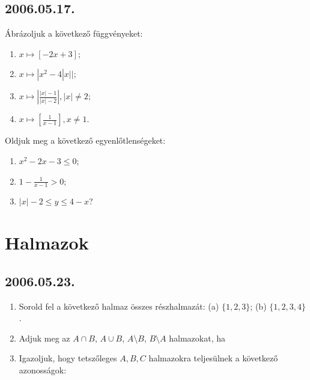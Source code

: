 \subsection*{2006.05.17.}
Ábrázoljuk a következő függvényeket:
\begin{enumerate}
\item $x \mapsto [-2x+3]$;
\item $x \mapsto |x^2-4|x||$;
\item $x \mapsto \left|\frac{|x|-1}{|x|-2}\right|, |x|\neq2$;
\item $x \mapsto \left[\frac{1}{x-1}\right], x\neq1$.
\end{enumerate}
Oldjuk meg a következő egyenlőtlenségeket:
\begin{enumerate}
\item $x^2-2x-3 \le 0$;
\item $1-\frac{1}{x-1}>0$;
\item $|x|-2 \le y \le 4-x$?
\end{enumerate}

\section{Halmazok}

\subsection*{2006.05.23.}
\begin{enumerate}
\item Sorold fel a következő halmaz összes részhalmazát:
(a) $\{1, 2, 3\}$;  (b) $\{1, 2, 3, 4\}$.
\item Adjuk meg az $A\cap B$, $A\cup B$, $A\setminus B$, $B\setminus A$ halmazokat, ha
\item Igazoljuk, hogy tetszőleges $A, B, C$ halmazokra teljesülnek a következő azonosságok:
\end{enumerate}
